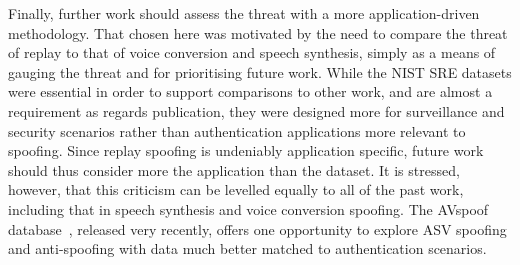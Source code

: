 
Finally, further work should assess the threat with a more application-driven methodology.  That chosen here was motivated by the need to compare the threat of replay to that of voice conversion and speech synthesis, simply as a means of gauging the threat and for prioritising future work.  While the NIST SRE datasets were essential in order to support comparisons to other work, and are almost a requirement as regards publication, they were designed more for surveillance and security scenarios rather than authentication applications more relevant to spoofing.  Since replay spoofing is undeniably application specific, future work should thus consider more the application than the dataset.  It is stressed, however, that this criticism can be levelled equally to all of the past work, including that in speech synthesis and voice conversion spoofing.  The AVspoof database~\cite{Ergunay2015}, released very recently, offers one opportunity to explore ASV spoofing and anti-spoofing with data much better matched to authentication scenarios.
